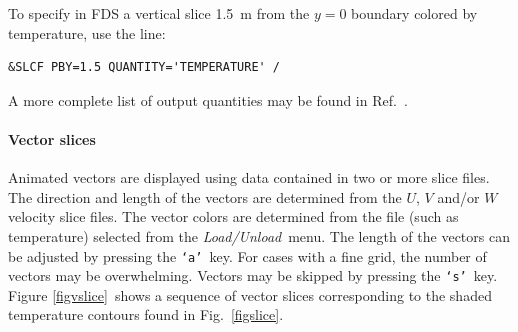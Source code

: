\documentclass[11pt,twoside]{book}
\begin{document}
\indent To specify in FDS a vertical slice 1.5~m from the $y=0$
boundary colored by temperature, use the line:
\begin{lstlisting}[basicstyle=\ttfamily]
&SLCF PBY=1.5 QUANTITY='TEMPERATURE' /
\end{lstlisting}
A more complete list of output quantities may be found in
Ref.~\cite{FDS_Users_Guide}.

\paragraph{Vector slices}Animated vectors are displayed using data contained in two or more
slice files.  The direction and length of the vectors are
determined from the $U$, $V$ and/or $W$ velocity slice files. The
vector colors are determined from the file (such as temperature)
selected from the {\em Load/Unload}\ menu. The length of the
vectors can be adjusted by pressing the {\tt `a'}\ key. For cases
with a fine grid, the number of vectors may be overwhelming.
Vectors may be skipped by pressing the {\tt `s'}\ key.  Figure
\ref{figvslice}\ shows a sequence of vector slices corresponding to
the shaded temperature contours found in Fig.~\ref{figslice}.
\end{document}
